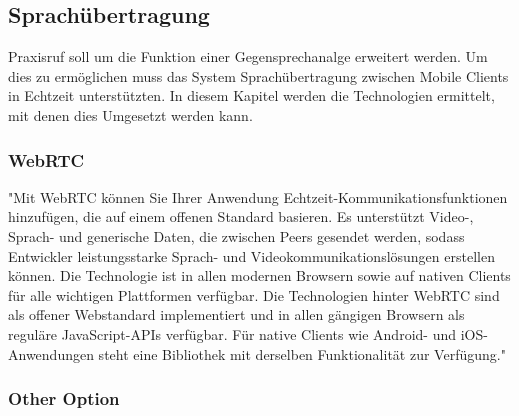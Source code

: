 \subsection{Sprachübertragung}

Praxisruf soll um die Funktion einer Gegensprechanalge erweitert werden.
Um dies zu ermöglichen muss das System Sprachübertragung zwischen Mobile Clients in Echtzeit unterstützten.
In diesem Kapitel werden die Technologien ermittelt, mit denen dies Umgesetzt werden kann.

\subsubsection*{WebRTC}

"Mit WebRTC können Sie Ihrer Anwendung Echtzeit-Kommunikationsfunktionen hinzufügen, die auf einem offenen Standard basieren.
Es unterstützt Video-, Sprach- und generische Daten, die zwischen Peers gesendet werden, sodass Entwickler leistungsstarke Sprach- und Videokommunikationslösungen erstellen können.
Die Technologie ist in allen modernen Browsern sowie auf nativen Clients für alle wichtigen Plattformen verfügbar.
Die Technologien hinter WebRTC sind als offener Webstandard implementiert und in allen gängigen Browsern als reguläre JavaScript-APIs verfügbar.
Für native Clients wie Android- und iOS-Anwendungen steht eine Bibliothek mit derselben Funktionalität zur Verfügung."\cite{webrtc}


\subsubsection*{Other Option}

\clearpage
